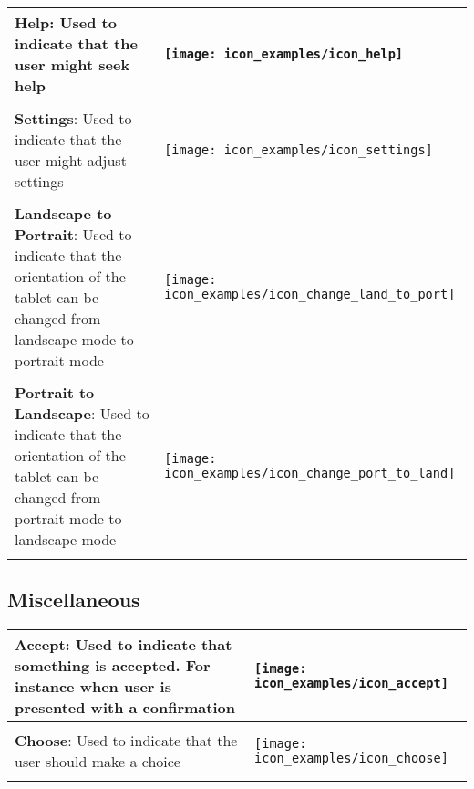 \begin{longtable}{m{\textwidth-2.2cm} m{1.5cm}}
	\textbf{Help}: Used to indicate that the user might seek help & \parbox[c]{1.2cm}{
	\texttt{[image: icon\_examples/icon\_help]}} \\[0.6cm] \hline \\[-1em]

	\textbf{Settings}: Used to indicate that the user might adjust settings & \parbox[c]{1.2cm}{
	\texttt{[image: icon\_examples/icon\_settings]}} \\[0.6cm] \hline \\[-1em]

	\textbf{Landscape to Portrait}: Used to indicate that the orientation of the tablet can be changed from landscape mode to portrait mode & \parbox[c]{1.2cm}{
	\texttt{[image: icon\_examples/icon\_change\_land\_to\_port]}} \\[0.6cm] \hline \\[-1em] 

	\textbf{Portrait to Landscape}: Used to indicate that the orientation of the tablet can be changed from portrait mode to landscape mode & \parbox[c]{1.2cm}{
	\texttt{[image: icon\_examples/icon\_change\_port\_to\_land]}} \\[0.6cm] \hline \\[-1em]
\end{longtable}


\subsection{Miscellaneous}

\begin{longtable}{m{\textwidth-2.2cm} m{1.5cm}}
	\textbf{Accept}: Used to indicate that something is accepted. For instance when user is presented with a confirmation & \parbox[c]{1.2cm}{
	\texttt{[image: icon\_examples/icon\_accept]}} \\[0.6cm] \hline \\[-1em]

	\textbf{Choose}: Used to indicate that the user should make a choice & \parbox[c]{1.2cm}{
	\texttt{[image: icon\_examples/icon\_choose]}} \\[0.6cm] \hline \\[-1em]
\end{longtable}